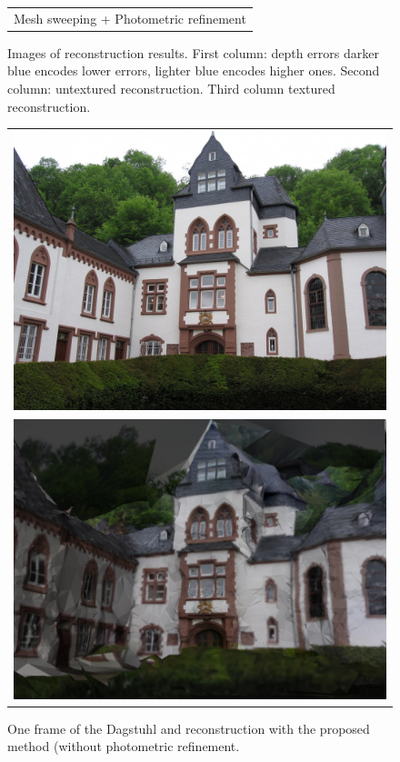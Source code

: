 \begin{figure}[t]
\begin{tabular}{ccc}
\multicolumn{3}{c}{Mesh sweeping + Photometric refinement}\\
\end{tabular}
\caption{Images of reconstruction results. First column: depth errors darker blue encodes lower errors, lighter blue encodes higher ones. Second column: untextured reconstruction. Third column textured reconstruction.}
\label{fig:fountainIm}
\end{figure}



\begin{figure}[t]
\setlength{\tabcolsep}{1px}
\centering
\begin{tabular}{c}
\includegraphics[width=0.8\columnwidth]{./img/dag004}\\
\includegraphics[width=0.8\columnwidth]{./img/d_crop}\\
\end{tabular}
\caption{One frame of the Dagstuhl and reconstruction with the proposed method (without photometric refinement.}
\label{fig:Dagstuhl}
\end{figure}

